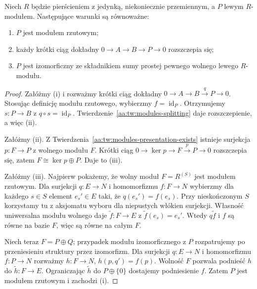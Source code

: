 \begin{twierdzenie}
\label{aa:tw:modules-projective-summand}
Niech $R$ będzie pierścieniem z jedynką,
niekoniecznie przemiennym, a $P$ lewym $R$-modułem.
Następujące warunki są równoważne:
\begin{enumerate}[label=\textup{(\roman*)}]
\item $P$ jest modułem rzutowym;
\item każdy krótki ciąg dokładny
$0\to A\to B\to P\to0$ rozszczepia się;
\item $P$ jest izomorficzny ze składnikiem sumy prostej
pewnego wolnego lewego $R$-modułu.
\end{enumerate}
\end{twierdzenie}
\begin{proof}
Załóżmy (i) i rozważmy krótki ciąg dokładny
$0\to A\to B\xrightarrow{q}P\to0$.
Stosując definicję modułu rzutowego, wybierzmy $f=\operatorname{id}_P$.
Otrzymujemy $s:P\to B$ z $q\circ s=\operatorname{id}_P$.
Twierdzenie~\ref{aa:tw:modules-splitting} daje rozszczepienie,
a więc (ii).

Załóżmy (ii). Z Twierdzenia~\ref{aa:tw:modules-presentation-exists}
istnieje surjekcja $p:F\to P$ z wolnego modułu $F$.
Krótki ciąg $0\to\ker p\to F\xrightarrow{p}P\to0$
rozszczepia się, zatem $F\cong\ker p\oplus P$.
Daje to (iii).

Załóżmy (iii). Najpierw pokażemy, że wolny moduł
$F=R^{(S)}$ jest modułem rzutowym. Dla surjekcji
$q:E\to N$ i homomorfizmu $f:F\to N$ wybierzmy
dla każdego $s\in S$ element $e_s'\in E$ taki, że
$q(e_s')=f(e_s)$. Przy nieskończonym $S$ korzystamy
tu z aksjomatu wyboru dla niepustych włókien surjekcji.
Własność uniwersalna modułu
wolnego daje $\widetilde f:F\to E$ z
$\widetilde f(e_s)=e_s'$. Wtedy $q\widetilde f$
i $f$ są równe na bazie $F$, więc są równe
na całym $F$.

Niech teraz $F=P\oplus Q$; przypadek modułu
izomorficznego z $P$ rozpatrujemy po przeniesieniu
struktury przez izomorfizm. Dla surjekcji $q:E\to N$
i homomorfizmu $f:P\to N$ rozważmy
$h:F\to N$, $h(p,q')=f(p)$. Wolność $F$
pozwala podnieść $h$ do $\widetilde h:F\to E$.
Ograniczając $\widetilde h$ do $P\oplus\{0\}$
dostajemy podniesienie $f$. Zatem $P$ jest modułem rzutowym i zachodzi (i).
\end{proof}

